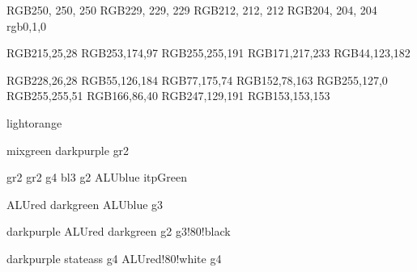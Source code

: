 \definecolor{gr1}		{RGB}{250, 250, 250}
\definecolor{gr2}		{RGB}{229, 229, 229}
\definecolor{gr3}		{RGB}{212, 212, 212}
\definecolor{gr4}		{RGB}{204, 204, 204}
\definecolor{itpGreen}  {rgb}{0,1,0}

\definecolor{g1}		{RGB}{215,25,28} %
\definecolor{g2}		{RGB}{253,174,97} %
\definecolor{g3}		{RGB}{255,255,191} %
\definecolor{g4}		{RGB}{171,217,233} %
\definecolor{g5}		{RGB}{44,123,182} %

\definecolor{s1}		{RGB}{228,26,28}
\definecolor{s2}		{RGB}{55,126,184}
\definecolor{s3}		{RGB}{77,175,74}
\definecolor{s4}		{RGB}{152,78,163}
\definecolor{s5}		{RGB}{255,127,0}
\definecolor{s6}		{RGB}{255,255,51}
\definecolor{s7}		{RGB}{166,86,40}
\definecolor{s8}		{RGB}{247,129,191}
\definecolor{s9}		{RGB}{153,153,153}

		{lightorange}

		{mixgreen}
		{darkpurple}
	{gr2}

		{gr2} %
				{gr2} %
				{g4} %
			{bl3} %
			{g2}
		{ALUblue}
              {itpGreen}

			{ALUred}
			{darkgreen}
			{ALUblue}
		{g3}

		{darkpurple}
		{ALUred}
		{darkgreen}
		{g2}
		{g3!80!black}


			{darkpurple}
			{stateass}
			{g4}
			{ALUred!80!white}
			{g4}







